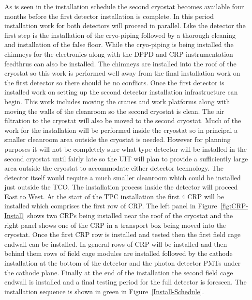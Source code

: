 As is seen in the installation schedule the second cryostat becomes available four months before the first detector installation is complete. In this period installation work for both detectors will proceed in parallel. Like the  detector
the first step is the installation of the cryo-piping followed by a thorough 
cleaning and installation of the false floor. While the cryo-piping is
being installed the  chimneys for the electronics along with
the DPPD and CRP instrumentation feedthrus can also be installed. The chimneys are installed into the roof of the cryostat so this work is performed well away from the final installation work on the first detector so there should be no conflicts. Once the first detector is installed work on setting up the second
detector installation infrastructure can begin. This work includes moving the cranes
and work platforms along with moving the walls of the cleanroom so the
second cryostat is clean. The air filtration to the cryostat will also be moved to the second cryostat.
Much of the work for the  installation
will be performed inside the cryostat so in principal a smaller cleanroom area outside the cryostat is needed. However for planning purposes it will not be completely sure what type detector will be installed in the second cryostat until fairly late so the UIT will plan to provide a sufficiently large area outside the cryostat to accommodate either detector technology. 
The detector itself would require a much smaller cleanroom which could be
installed just outside the TCO. The installation process inside the detector will proceed East to West. At the start of the TPC installation the first \num{4} CRP will be installed which comprises the first row of
CRP. The left panel in Figure~\ref{fig:CRP-Install} shows two CRPs being installed near the roof of the cryostat and the right panel shows one of the CRP in a transport box being moved into the cryostat.
Once the first CRP row is installed and tested then the first field cage
endwall can be installed. In general rows of CRP will be installed and
then behind them rows of field cage modules are installed followed by the cathode
installation at the bottom of the detector and the photon detector PMTs under the cathode plane. Finally at the end of the installation the second field cage endwall is installed and a final testing period for
the full detector is foreseen. The  installation sequence is
shown in green in Figure~\ref{Install-Schedule}.

